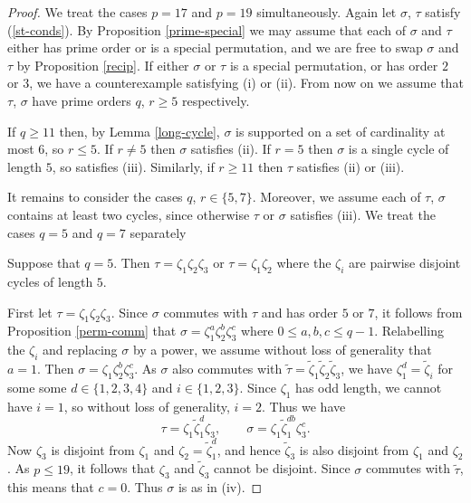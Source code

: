 \documentclass[letterpaper,12pt]{amsart}
\numberwithin{equation}{section}
\numberwithin{algorithm}{section}
\theoremstyle{definition}
\newcommand{\ttau}{\tilde{\tau}}
\newcommand{\tzeta}{\tilde{\zeta}}
\begin{document}
\begin{proof}
We treat the cases $p=17$ and $p=19$ simultaneously. Again let $\sigma$, $\tau$ satisfy (\ref{st-conds}). By Proposition \ref{prime-special} we may assume that each of $\sigma$ and $\tau$ either has prime order or is a special permutation, and we are free to swap $\sigma$ and $\tau$ by Proposition \ref{recip}. If either $\sigma$ or $\tau$ is a special permutation, or has order $2$ or $3$, we have a counterexample satisfying (i) or (ii). From now on we assume that $\tau$, $\sigma$ have prime orders $q$, $r \geq 5$ respectively.

If $q \geq 11$ then, by Lemma \ref{long-cycle}, $\sigma$ is supported on a set of cardinality at most $6$, so $r \leq 5$. If $r \neq 5$ then $\sigma$ satisfies (ii). If $r=5$ then $\sigma$ is a single cycle of length $5$, so satisfies (iii). Similarly, if $r \geq 11$ then $\tau$ satisfies (ii) or (iii). 

It remains to consider the cases $q$, $r \in \{5,7\}$. Moreover, we assume each of $\tau$, $\sigma$ contains at least two cycles, since otherwise $\tau$ or $\sigma$ satisfies (iii). We treat the cases $q=5$ and $q=7$ separately

 Suppose that $q=5$. Then  $\tau=\zeta_1 \zeta_2 \zeta_3$ or $\tau=\zeta_1 \zeta_2$ where the $\zeta_i$ are pairwise disjoint cycles of length $5$. 

First let $\tau = \zeta_1 \zeta_2 \zeta_3$. Since $\sigma$ commutes with $\tau$ and has order $5$ or $7$, it follows from Proposition \ref{perm-comm} that $\sigma= \zeta_1^a \zeta_2^b \zeta_3^c$ where $0 \leq a, b, c \leq q-1$. Relabelling the $\zeta_i$ and replacing $\sigma$ by a power, we assume without loss of generality that $a=1$. Then $\sigma= \zeta_1 \zeta_2^b \zeta_3^c$. As $\sigma$ also commutes with $\ttau = \tzeta_1 \tzeta_2 \tzeta_3$, we have $\zeta_1^d=\tzeta_i$ for some some $d \in \{1,2,3,4\}$ and $i \in \{1,2,3\}$. Since $\zeta_1$ has odd length, we cannot have $i=1$, so without loss of generality, $i=2$. Thus we have
$$ \tau = \zeta_1 \tzeta_1^d \zeta_3, \qquad \sigma = \zeta_1 \tzeta_1^{db} \zeta_3^c. $$
Now $\zeta_3$ is disjoint from $\zeta_1$ and $\zeta_2=\tzeta_1^d$, and hence $\tzeta_3$ is also disjoint from $\zeta_1$ and $\zeta_2$. As $p \leq 19$, it follows that $\zeta_3$ and $\tzeta_3$ cannot be disjoint. 
Since $\sigma$ commutes with $\ttau$, this means that $c=0$. Thus $\sigma$ is as in (iv). 


\end{proof}
\end{document}
